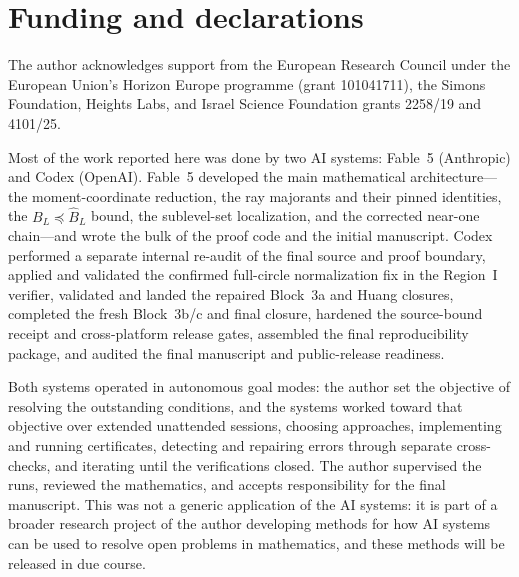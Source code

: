 \documentclass[11pt]{article}
\begin{document}
\section*{Funding and declarations}
The author acknowledges support from the European Research Council under the
European Union's Horizon Europe programme (grant 101041711), the Simons
Foundation, Heights Labs, and Israel Science Foundation grants 2258/19 and
4101/25.

Most of the work reported here was done by two AI systems: Fable~5
(Anthropic) and Codex (OpenAI). Fable~5 developed the main mathematical
architecture---the moment-coordinate reduction, the ray majorants and their
pinned identities, the $B_L\preceq\widehat B_L$ bound, the sublevel-set
localization, and the corrected near-one chain---and wrote the bulk of the
proof code and the initial manuscript. Codex performed a separate internal
re-audit of the final source and proof boundary, applied and validated the confirmed
full-circle normalization fix in the Region~I verifier, validated and landed
the repaired Block~3a and Huang closures, completed the fresh Block~3b/c and
final closure, hardened the source-bound receipt and cross-platform release
gates, assembled the final reproducibility package, and audited the final
manuscript and public-release readiness.

Both systems operated in autonomous goal modes: the author set the objective
of resolving the outstanding conditions, and the systems worked toward that
objective over extended unattended sessions, choosing approaches,
implementing and running certificates, detecting and repairing errors through
separate cross-checks, and iterating until the verifications closed. The
author supervised the runs, reviewed the mathematics, and accepts
responsibility for the final manuscript. This was not a generic application
of the AI systems: it is part of a broader research project of the author
developing methods for how AI systems can be used to resolve open problems
in mathematics, and these methods will be released in due course.
\end{document}
